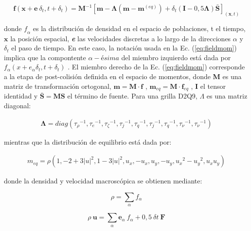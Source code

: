 \begin{equation}
    \mathbf{f}(\mathbf{x} + \mathbf{e} \> \delta_{t} , t + \delta_{t}) = \mathbf{M}^{-1} \left[ \mathbf{m} - \mathbf{\Lambda}(\mathbf{m} - \mathbf{m}^{(eq)}) + \delta_{t} \left( \mathbf{I} - 0,5 \mathbf{\Lambda} \right) \mathbf{\bar{S}}  \right]_{(\mathbf{x},t)} 
    \label{eq:fieldmom}
\end{equation}

donde $\textit{f}_{\alpha}$ es la distribución de densidad en el espacio de poblaciones, t el tiempo, $\mathbf{x}$ la posición espacial, \textit{\textbf{e}} las velocidades discretas a lo largo de la direcciones $\alpha$ y $\delta_{t}$ el paso de tiempo. En este caso, la notación usada en la Ec. (\ref{eq:fieldmom}) implica que la compontente $\alpha-ésima$ del miembro izquierdo está dada por $f_{\alpha}(x + e_{\alpha} \delta_{t}  , t + \delta_{t} )$ . El miembro derecho de la Ec. (\ref{eq:fieldmom}) corresponde a la etapa de post-colisión definida en el espacio de momentos, donde \textbf{M} es una matriz de transformación ortogonal, $\mathbf{m} = \mathbf{M} \cdot \mathbf{f}$ , $\mathbf{m}_{eq} = \mathbf{M} \cdot \mathbf{f}_{eq}$ , \textbf{I} el tensor identidad y $\mathbf{\bar{S}} = \mathbf{M} \mathbf{S}$ el término de fuente. Para una grilla D2Q9, $ \Lambda$ es una matriz diagonal:
    
\begin{align}
    \mathbf{\Lambda}  = diag ( {\tau_{\rho }}^{-1},{\tau_{e}}^{-1},{\tau_{\zeta }}^{-1},{\tau_{j}}^{-1},{\tau_{q}}^{-1},{\tau_{j}}^{-1},{\tau_{q}}^{-1},{\tau_{\nu }}^{-1},{\tau_{\nu}}^{-1}) 
    \label{eq:lambda}
\end{align}

mientras que la distribución de equilibrio está dada por:
        

\begin{align}
    m_{eq} =  \rho  \left( 1, - 2 + 3 {|u|}^{2} , 1 - 3{|u|}^{2} , u_{x} , - u_{x} , u_{y} , - u_{y} , {u_{x}}^{2} - {u_{y}}^{2} , u_{x} u_{y} \right) 
    \label{eq:m}
\end{align}


donde la densidad y velocidad macroscópica se obtienen mediante:

\begin{equation}
        \rho = \sum_{\alpha} f_{\alpha}
\end{equation}

\begin{equation}
    \rho \> \mathbf{u} = \sum_{\alpha} {\mathbf{e}}_{\alpha} \> f_{\alpha} + 0,5 \> {\delta}{t} \> \mathbf{F}
\end{equation}


